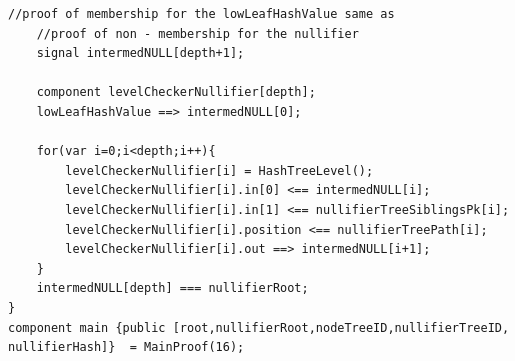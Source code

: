 \documentclass[12pt, letterpaper]{article}
\begin{document}
\begin{lstlisting}[caption="MainProof.circom"]
    //proof of membership for the lowLeafHashValue same as 
    //proof of non - membership for the nullifier
    signal intermedNULL[depth+1];

    component levelCheckerNullifier[depth];
    lowLeafHashValue ==> intermedNULL[0];

    for(var i=0;i<depth;i++){
        levelCheckerNullifier[i] = HashTreeLevel();
        levelCheckerNullifier[i].in[0] <== intermedNULL[i];
        levelCheckerNullifier[i].in[1] <== nullifierTreeSiblingsPk[i];
        levelCheckerNullifier[i].position <== nullifierTreePath[i];
        levelCheckerNullifier[i].out ==> intermedNULL[i+1];
    }
    intermedNULL[depth] === nullifierRoot;    
}
component main {public [root,nullifierRoot,nodeTreeID,nullifierTreeID,
nullifierHash]}  = MainProof(16);
\end{lstlisting}
\end{document}
